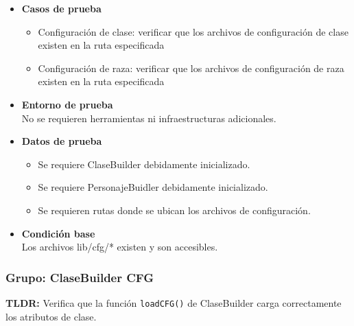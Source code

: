 \documentclass{article}
\begin{document}
\begin{itemize}
	\item \textbf{Casos de prueba}
	\begin{itemize}
		\item Configuración de clase: verificar que los archivos de configuración de clase existen en la ruta especificada
		\item Configuración de raza: verificar que los archivos de configuración de raza existen en la ruta especificada
	\end{itemize}
	\item \textbf{Entorno de prueba}\\
	No se requieren herramientas ni infraestructuras adicionales.

	\item \textbf{Datos de prueba}
	\begin{itemize}
		\item 	Se requiere ClaseBuilder debidamente inicializado.
			\item Se requiere PersonajeBuidler debidamente inicializado.
			\item Se requieren rutas donde se ubican los archivos de configuración.
	\end{itemize}

	
	\item \textbf{Condición base}\\
	Los archivos lib/cfg/* existen y son accesibles. 
\end{itemize}


\subsubsection{Grupo: ClaseBuilder CFG}
\textbf{TLDR:} Verifica que la función \texttt{loadCFG()} de ClaseBuilder carga correctamente los atributos de clase.
\end{document}
